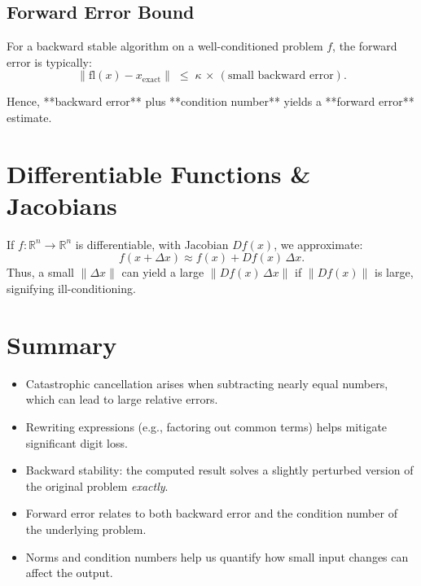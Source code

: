 \subsection*{Forward Error Bound}
For a backward stable algorithm on a well-conditioned problem $f$, the forward error is typically:
\[
\|\mathrm{fl}(x) - x_{\mathrm{exact}}\| \;\le\; \kappa \,\times\, (\text{small backward error}).
\]

Hence, **backward error** plus **condition number** yields a **forward error** estimate.

\section*{Differentiable Functions \& Jacobians}

If $f:\mathbb{R}^n \to \mathbb{R}^n$ is differentiable, with Jacobian $Df(x)$, we approximate:
\[
f(x + \Delta x) \approx f(x) + Df(x)\,\Delta x.
\]
Thus, a small $\|\Delta x\|$ can yield a large $\|Df(x)\,\Delta x\|$ if $\|Df(x)\|$ is large, signifying ill-conditioning.

\section*{Summary}

\begin{itemize}
    \item Catastrophic cancellation arises when subtracting nearly equal numbers, which can lead to large relative errors.
    \item Rewriting expressions (e.g., factoring out common terms) helps mitigate significant digit loss.
    \item Backward stability: the computed result solves a slightly perturbed version of the original problem \emph{exactly}.
    \item Forward error relates to both backward error and the condition number of the underlying problem.
    \item Norms and condition numbers help us quantify how small input changes can affect the output.
\end{itemize}

